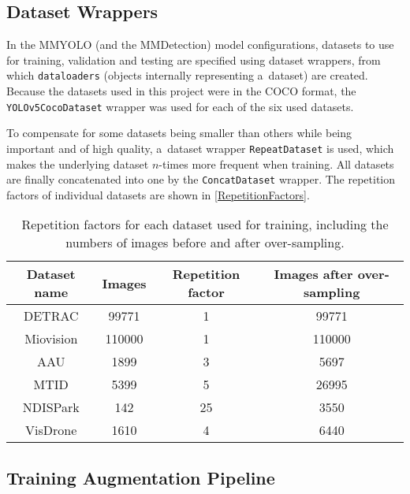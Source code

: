 \subsection{Dataset Wrappers}

In the MMYOLO (and the MMDetection) model configurations, datasets to use for
training, validation and testing are specified using dataset wrappers, from
which \texttt{dataloaders} (objects internally representing a~dataset) are
created. Because the datasets used in this project were in the COCO format, the
\texttt{YOLOv5CocoDataset} wrapper was used for each of the six used datasets.

To compensate for some datasets being smaller than others while being important
and of high quality, a~dataset wrapper \texttt{RepeatDataset} is used, which
makes the underlying dataset $n$-times more frequent when training. All datasets are finally
concatenated into one by the \texttt{ConcatDataset} wrapper. The repetition
factors of individual datasets are shown in \autoref{RepetitionFactors}.

\begin{table}[t]
    \centering
    \small
    \begin{threeparttable}
        \begin{tabular}{|c|c|c|c|}
            \hline
            Dataset name & Images & Repetition factor & Images after over-sampling \\
            \hline
            DETRAC       &  \num{99771} &  1 & \num{99771} \\
            Miovision    & \num{110000} &  1 & \num{110000} \\
            AAU          &   \num{1899} &  3 & \num{5697} \\
            MTID         &   \num{5399} &  5 & \num{26995} \\
            NDISPark     &    \num{142} & 25 & \num{3550} \\
            VisDrone     &   \num{1610} &  4 & \num{6440} \\
            \hline
        \end{tabular}
        \caption{Repetition factors for each dataset used for training, including the
        numbers of images before and after over-sampling.}
        \label{RepetitionFactors}
    \end{threeparttable}
\end{table}


\subsection{Training Augmentation Pipeline}

